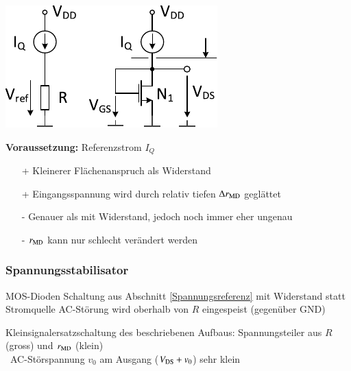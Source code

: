 \begin{minipage}[t]{0.44\columnwidth}
    \includegraphics[width=\columnwidth, align=t]{images/04_MOS_diode_spannungsreferenz.pdf}
\end{minipage}
\hfill
\begin{minipage}[t]{0.52\columnwidth}
    \textbf{Voraussetzung: } Referenzstrom $I_Q$
    \smallskip

    \begin{itemize}
        \item[+] Kleinerer Flächenanspruch als Widerstand
        \item[+] Eingangsspannung wird durch relativ tiefen $\Delta r_{\rm MD}$ geglättet
        \item[-] Genauer als mit Widerstand, jedoch noch immer eher ungenau
        \item[-] $r_{\rm MD}$ kann nur schlecht verändert werden
    \end{itemize}
\end{minipage}


\subsubsection{Spannungsstabilisator}

\begin{minipage}[t]{0.48\columnwidth}
    \begin{outline}
        \1 MOS-Dioden Schaltung aus Abschnitt \ref{Spannungsreferenz} mit Widerstand statt Stromquelle
        \1 AC-Störung wird oberhalb von $R$ eingespeist (gegenüber GND)
    \end{outline}
\end{minipage}
\hfill
\begin{minipage}[t]{0.48\columnwidth}
    \raggedright
    
    \begin{outline}
        \1 Kleinsignalersatzschaltung des beschriebenen Aufbaus:
            \2 Spannungsteiler aus $R$ (gross) und $r_{\rm MD}$ (klein) \\
            \textrightarrow\ AC-Störspannung $v_0$ am Ausgang ($V_{\rm DS} + v_0$) sehr klein
    \end{outline}
\end{minipage}



